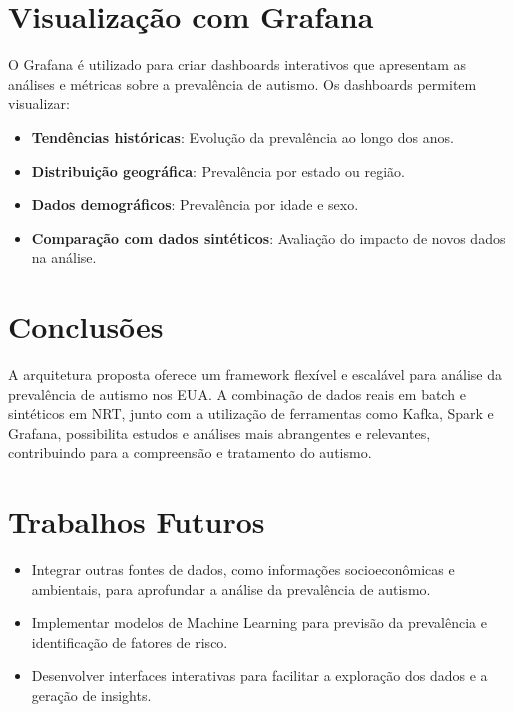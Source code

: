 \documentclass[12pt]{article}
\begin{document}
\section{Visualização com Grafana}

O Grafana é utilizado para criar dashboards interativos que apresentam as análises e métricas sobre a prevalência de autismo. Os dashboards permitem visualizar:
\begin{itemize}
    \item \textbf{Tendências históricas}: Evolução da prevalência ao longo dos anos.
    \item \textbf{Distribuição geográfica}: Prevalência por estado ou região.
    \item \textbf{Dados demográficos}: Prevalência por idade e sexo.
    \item \textbf{Comparação com dados sintéticos}: Avaliação do impacto de novos dados na análise.
\end{itemize}

\section{Conclusões}

A arquitetura proposta oferece um framework flexível e escalável para análise da prevalência de autismo nos EUA. A combinação de dados reais em batch e sintéticos em NRT, junto com a utilização de ferramentas como Kafka, Spark e Grafana, possibilita estudos e análises mais abrangentes e relevantes, contribuindo para a compreensão e tratamento do autismo.

\section{Trabalhos Futuros}

\begin{itemize}
    \item Integrar outras fontes de dados, como informações socioeconômicas e ambientais, para aprofundar a análise da prevalência de autismo.
    \item Implementar modelos de Machine Learning para previsão da prevalência e identificação de fatores de risco.
    \item Desenvolver interfaces interativas para facilitar a exploração dos dados e a geração de insights.
\end{itemize}



\end{document}
